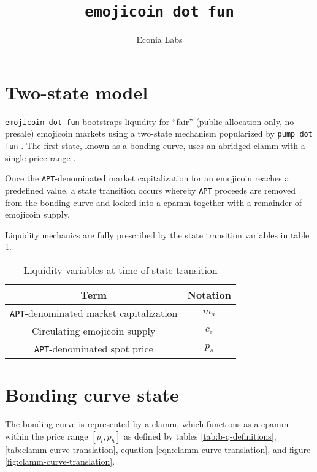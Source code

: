 \documentclass[table, twocolumn]{article}
\title{\texttt{emojicoin dot fun}}
\author{Econia Labs}
\date{}
\begin{document}
\maketitle

\section{Two-state model}

\texttt{emojicoin dot fun} bootstraps liquidity for ``fair'' (public allocation only, no
presale) emojicoin \cite{emojicoin} markets using a two-state mechanism popularized
by \texttt{pump dot fun} \cite{pump}. The first state, known as a bonding curve, uses an
abridged \gls*{clamm} with a single price range \cite{univ3}.

Once the \texttt{APT}-denominated \cite{octa} market capitalization for an emojicoin
reaches a predefined value, a state transition occurs whereby \texttt{APT} proceeds
are removed from the bonding curve and locked into a \gls*{cpamm} \cite{univ2} together
with a remainder of emojicoin supply.

Liquidity mechanics are fully prescribed by the state transition variables in table
\ref{tab:state-model-variables}.

\begin{table}[!htb]
  \centering
  \begin{tabular}{|c|c|}
    \hline \rowcolor{blue}
    Term                                           & Notation \\ \hline
    \texttt{APT}-denominated market capitalization & $m_a$    \\ \hline
    Circulating emojicoin supply                   & $c_e$    \\ \hline
    \texttt{APT}-denominated spot price            & $p_s$    \\ \hline
  \end{tabular}
  \caption{Liquidity variables at time of state transition}
  \label{tab:state-model-variables}
\end{table}

\section{Bonding curve state}

The bonding curve is represented by a \gls*{clamm}, which functions as a \gls*{cpamm}
within the price range $[p_l, p_h]$ as defined by tables \ref{tab:b-q-definitions},
\ref{tab:clamm-curve-translation}, equation \ref{eqn:clamm-curve-translation}, and
figure \ref{fig:clamm-curve-translation}.
\end{document}
